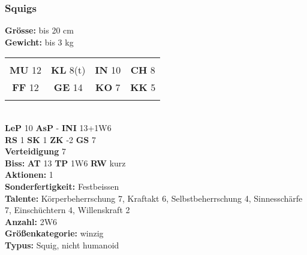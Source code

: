\documentclass[9pt]{article}
\begin{document}
\begin{multicols}{2}
\begin{shaded*}
		\subsubsection{Squigs}
		\textbf{Grösse:} bis 20 cm\\
		\textbf{Gewicht:} bis 3 kg\\
		\begin{tabular}{cccc}
			&&&\\
			\textbf{MU} 12 & \textbf{KL} 8(t) & \textbf{IN} 10 & \textbf{CH} 8 \\ 
			\textbf{FF} 12 & \textbf{GE} 14 & \textbf{KO} 7 & \textbf{KK} 5 \\
			&&&\\
		\end{tabular}
		\\
		\textbf{LeP} 10 \textbf{AsP} -	\textbf{INI} 13+1W6 \\
		\textbf{RS} 1 	\textbf{SK} 1	\textbf{ZK} -2		\textbf{GS} 7 \\
		\textbf{Verteidigung} 7 \\
		\textbf{Biss: }\textbf{AT} 13 \textbf{TP } 1W6 \textbf{RW }kurz \\
		\textbf{Aktionen:} 1 \\
		\textbf{Sonderfertigkeit:} Festbeissen \\
		\textbf{Talente:} Körperbeherrschung 7, Kraftakt 6, Selbstbeherrschung 4, Sinnesschärfe 7, Einschüchtern 4, Willenskraft 2
		\\
		\textbf{Anzahl:} 2W6 \\
		\textbf{Größenkategorie:} winzig \\
		\textbf{Typus:} Squig, nicht humanoid \\
	\end{shaded*}
\begin{shaded*}		

\end{shaded*}
\end{multicols}
\end{document}
